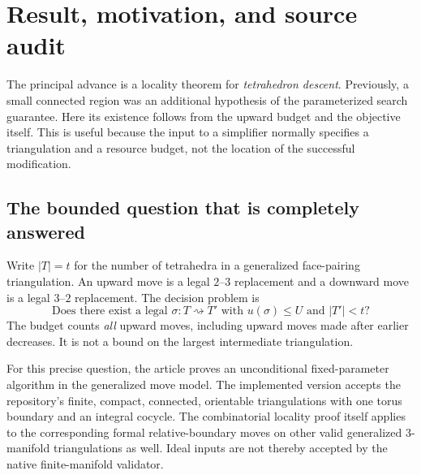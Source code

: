 \section{Result, motivation, and source audit}

The principal advance is a locality theorem for \emph{tetrahedron descent}.
Previously, a small connected region was an additional hypothesis of the
parameterized search guarantee. Here its existence follows from the upward
budget and the objective itself. This is useful because the input to a
simplifier normally specifies a triangulation and a resource budget, not
the location of the successful modification.

\subsection{The bounded question that is completely answered}

Write $|T|=t$ for the number of tetrahedra in a generalized face-pairing
triangulation. An upward move is a legal $2$--$3$ replacement and a downward
move is a legal $3$--$2$ replacement. The decision problem is
\begin{equation}\label{eq:decision}
 \text{Does there exist a legal }\sigma:T\rightsquigarrow T'
 \text{ with }u(\sigma)\le U\text{ and }|T'|<t\text{?}
\end{equation}
The budget counts \emph{all} upward moves, including upward moves made after
earlier decreases. It is not a bound on the largest intermediate triangulation.

For this precise question, the article proves an unconditional
fixed-parameter algorithm in the generalized move model. The implemented
version accepts the repository's finite, compact, connected, orientable
triangulations with one torus boundary and an integral cocycle. The combinatorial
locality proof itself applies to the corresponding formal relative-boundary
moves on other valid generalized $3$-manifold triangulations as well. Ideal
inputs are not thereby accepted by the native finite-manifold validator.

